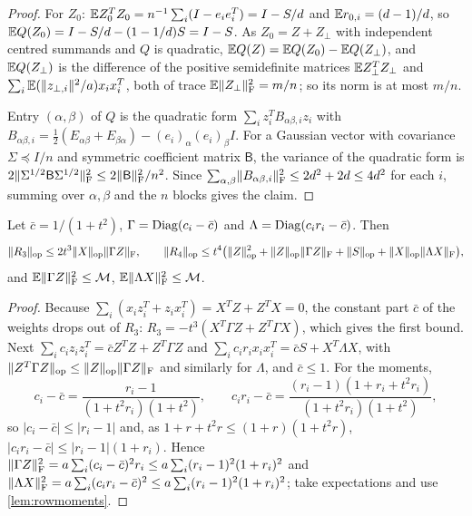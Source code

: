 \begin{proof}
For $Z_0$: $\mathbb E Z_0^TZ_0=n^{-1}\sum_i(I-e_ie_i^T)=I-S/d$ and $\mathbb E r_{0,i}=(d-1)/d$,
so $\mathbb E Q(Z_0)=I-S/d-(1-1/d)S=I-S$. As $Z_0=Z+Z_\perp$ with independent centred
summands and $Q$ is quadratic, $\mathbb E Q(Z)=\mathbb E Q(Z_0)-\mathbb E Q(Z_\perp)$, and
$\mathbb E Q(Z_\perp)$ is the difference of the positive semidefinite matrices
$\mathbb E Z_\perp^TZ_\perp$ and $\sum_i\mathbb E(\lVert z_{\perp,i}\rVert^2/a)x_ix_i^T$, both of trace
$\mathbb E\lVert Z_\perp\rVert_{\mathrm F}^2=m/n$; so its norm is at most $m/n$.

Entry $(\alpha,\beta)$ of $Q$ is the quadratic form $\sum_iz_i^TB_{\alpha\beta,i}z_i$
with $B_{\alpha\beta,i}=\frac12(E_{\alpha\beta}+E_{\beta\alpha})-(e_i)_\alpha(e_i)_\beta I$.
For a Gaussian vector with covariance $\Sigma\preceq I/n$ and symmetric
coefficient matrix $\mathsf B$, the variance of the quadratic form is
$2\lVert \Sigma^{1/2}\mathsf B\Sigma^{1/2}\rVert_{\mathrm F}^2\le2\lVert \mathsf B\rVert_{\mathrm F}^2/n^2$. Since
$\sum_{\alpha,\beta}\lVert B_{\alpha\beta,i}\rVert_{\mathrm F}^2\le2d^2+2d\le4d^2$ for each $i$,
summing over $\alpha,\beta$ and the $n$ blocks gives the claim.
\end{proof}

\begin{lemma}[Remainder]\label{lem:remainder}
Let $\bar c=1/(1+t^2)$, $\Gamma=\operatorname{Diag}(c_i-\bar c)$ and
$\Lambda=\operatorname{Diag}(c_ir_i-\bar c)$. Then
\[
 \lVert R_3\rVert_{\mathrm{op}}\le2t^3\lVert X\rVert_{\mathrm{op}}\lVert \Gamma Z\rVert_{\mathrm F},\qquad
 \lVert R_4\rVert_{\mathrm{op}}\le t^4\bigl(\lVert Z\rVert_{\mathrm{op}}^2+\lVert Z\rVert_{\mathrm{op}}\lVert \Gamma Z\rVert_{\mathrm F}+\lVert S\rVert_{\mathrm{op}}+\lVert X\rVert_{\mathrm{op}}\lVert \Lambda X\rVert_{\mathrm F}\bigr),
\]
and $\mathbb E\lVert \Gamma Z\rVert_{\mathrm F}^2\le\mathcal M$, $\mathbb E\lVert \Lambda X\rVert_{\mathrm F}^2\le\mathcal M$.
\end{lemma}

\begin{proof}
Because $\sum_i(x_iz_i^T+z_ix_i^T)=X^TZ+Z^TX=0$, the constant part $\bar c$ of
the weights drops out of $R_3$:
$R_3=-t^3(X^T\Gamma Z+Z^T\Gamma X)$, which gives the first bound. Next
$\sum_ic_iz_iz_i^T=\bar cZ^TZ+Z^T\Gamma Z$ and $\sum_ic_ir_ix_ix_i^T=\bar cS+X^T\Lambda X$,
with $\lVert Z^T\Gamma Z\rVert_{\mathrm{op}}\le\lVert Z\rVert_{\mathrm{op}}\lVert \Gamma Z\rVert_{\mathrm F}$ and similarly for $\Lambda$, and
$\bar c\le1$. For the moments,
\[
 c_i-\bar c=\frac{r_i-1}{(1+t^2r_i)(1+t^2)},\qquad
 c_ir_i-\bar c=\frac{(r_i-1)(1+r_i+t^2r_i)}{(1+t^2r_i)(1+t^2)},
\]
so $|c_i-\bar c|\le|r_i-1|$ and, as $1+r+t^2r\le(1+r)(1+t^2r)$,
$|c_ir_i-\bar c|\le|r_i-1|(1+r_i)$. Hence
$\lVert \Gamma Z\rVert_{\mathrm F}^2=a\sum_i(c_i-\bar c)^2r_i\le a\sum_i(r_i-1)^2(1+r_i)^2$ and
$\lVert \Lambda X\rVert_{\mathrm F}^2=a\sum_i(c_ir_i-\bar c)^2\le a\sum_i(r_i-1)^2(1+r_i)^2$; take
expectations and use \cref{lem:rowmoments}.
\end{proof}

